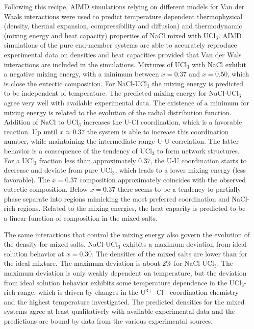 \documentclass[preprint,3p,10pt,onecolumn,number,sort&compress]{elsarticle}
\begin{document}
{Following this recipe, AIMD simulations relying on different models for Van der Waals interactions were used to predict temperature dependent thermophysical (density, thermal expansion, compressibility and diffusion) and thermodynamic (mixing energy and heat capacity) properties of NaCl mixed with UCl$_3$. %
AIMD simulations of the pure end-member systems are able to accurately reproduce experimental data on densities and heat capacities provided that Van der Wals interactions are included in the simulations. %
Mixtures of UCl$_3$ with NaCl exhibit a negative mixing energy, with a minimum between $x=0.37$ and $x=0.50$, which is close the eutectic composition. 
For NaCl-UCl$_3$ the mixing energy is predicted to be independent of temperature. The predicted mixing energy for NaCl-UCl$_3$ agree very well with available experimental data. 
The existence of a minimum for mixing energy is related to the evolution of the radial distribution function. Addition of NaCl to UCl$_3$ increases the U-Cl coordination, which is a favorable reaction. Up until $x\approx0.37$ the system is able to increase this coordination number, while maintaining the intermediate range U-U correlation. The latter behavior is a consequence of the tendency of UCl$_3$ to form network structures. For a UCl$_3$ fraction less than approximately 0.37, the U-U coordination starts to decrease and deviate from pure UCl$_3$, which leads to a lower mixing energy (less favorable). The $x=0.37$ composition approximately coincides with the observed eutectic composition. Below $x=0.37$ there seems to be a tendency to partially phase separate into regions mimicking the most preferred coordination and NaCl-rich regions. Related to the mixing energies, the heat capacity is predicted to be a linear function of composition in the mixed salts.

The same interactions that control the mixing energy also govern the evolution of the density for mixed salts. NaCl-UCl$_3$ exhibits a maximum deviation from ideal solution behavior at $x=0.30$. The densities of the mixed salts are lower than for the ideal mixture. The maximum deviation is about 2\% for NaCl-UCl$_3$. The maximum deviation is only weakly dependent on temperature, but the deviation from ideal solution behavior exhibits some temperature dependence in the UCl$_3$-rich range, which is driven by changes in the U$^{3+}$-Cl$^{-}$  coordination chemistry and the highest temperature investigated.
 The predicted densities for the mixed systems agree at least qualitatively with available experimental data and the predictions are bound by data from the various experimental sources. 

}
\end{document}

